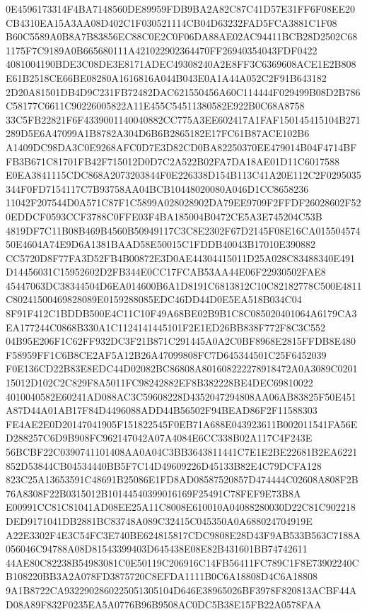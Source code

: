 \documentclass[UTF8,fontset=fandol,zihao=-4,a4paper]{ctexart}
\begin{document}
{{0E4596173314F4BA7148560DE89959FDB9BA2A82C87C41D57E31FF6F08EE20CB4310EA15A3AA08D402C1F030521114CB04D63232FAD5FCA3881C1F08
B60C5589A0B8A7B83856EC88C0E2C0F06DA88AE02AC94411BCB28D2502C681175F7C9189A0B665680111A421022902364470FF26940354043FDF0422
4081004190BDE3C08DE3E8171ADEC49308240A2E8FF3C6369608ACE1E2B808E61B2518CE66BE08280A1616816A044B043E0A1A44A052C2F91B643182
2D20A81501DB4D9C231FB72482DAC621550456A60C114444F029499B08D2B786C58177C6611C90226005822A11E455C54511380582E922B0C68A8758
33C5FB22821F6F4339001140040882CC775A3EE602417A1FAF150145415104B271289D5E6A47099A1B8782A304D6B6B2865182E17FC61B87ACE102B6
A1409DC98DA3C0E9268AFC0D7E3D82CD0BA82250370EE479014B04F4714BFFB3B671C81701FB42F715012D0D7C2A522B02FA7DA18AE01D11C6017588
E0EA3841115CDC868A2073203844F0E226338D154B113C41A20E112C2F0295035344F0FD7154117C7B93758AA04BCB10448020080A046D1CC8658236
11042F207544D0A571C87F1C5899A028028902DA79EE9709F2FFDF26028602F520EDDCF0593CCF3788C0FFE03F4BA185004B0472CE5A3E745204C53B
4819DF7C11B08B469B4560B50949117C3C8E2302F67D2145F08E16CA01550457450E4604A74E9D6A1381BAAD58E50015C1FDDB40043B17010E390882
CC5720D8F77FA3D52FB4B00872E3D0AE44304415011D25A028C83488340E491D14456031C15952602D2FB344E0CC17FCAB53AA44E06F22930502FAE8
45447063DC38344504D6EA014600B6A1D8191C6813812C10C82182778C500E4811C80241500469828089E0159288085EDC46DD44D0E5EA518B034C04
8F91F412C1BDDB500E4C11C10F49A68BE02B9B1C8C085020401064A6179CA3EA177244C0868B330A1C1124141445101F2E1ED26BB838F772F8C3C552
04B95E206F1C62FF932DC3F21B871C291445A0A2C0BF8968E2815FFDB8E480F58959FF1C6B8CE2AF5A12B26A47099808FC7D645344501C25F6452039
F0E136CD22B83E8EDC44D02082BC86808A801608222278918472A0A3089C020115012D102C2C829F8A5011FC98242882EF8B382228BE4DEC69810022
4010040582E60241AD088AC3C59608228D4352047294808AA06AB83825F50E451A87D44A01AB17F84D4496088ADD44B56502F94BEAD86F2F11588303
FE4AE2E0D20147041905F151822545F0EB71A688E043923611B002011541FA56ED288257C6D9B908FC962147042A07A4084E6CC338B02A117C4F243E
56BCBF22C0390741101408AA0A04C3BB3643811441C7E1E2BE22681B2EA6221852D53844CB04534440BB5F7C14D49609226D45133B82E4C79DCFA128
823C25A13653591C48691B25086E1FD8AD08587520857D474444C02608A808F2B76A8308F22B0315012B10144540399016169F25491C78FEF9E73B8A
E00991CC81C81041AD08EE25A11C8008E610010A04088280030D22C81C902218DED9171041DB2881BC83748A089C32415C045350A0A688024704919E
A22E3302F4E3C54FC3E740BE624815817CDC9808E28D43F9AB533B563C7188A056046C94788A08D81543399403D645438E08E82B431601BB74742611
44AE80C82238B54983081C0E50119C206916C14FB56411FC789C1F8E73902240CB108220BB3A2A078FD3875720C8EFDA1111B0C6A18808D4C6A18808
9A1B8722CA9322902860225051305104D646E38965026BF3978F820813ACBF44AD08A89F832F0235EA5A0776B96B9508AC0DC5B38E15FB22A0578FAA
}}
\end{document}
